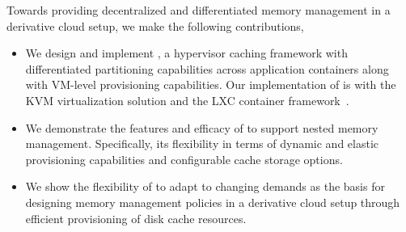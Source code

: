%
%
Towards providing decentralized and differentiated memory management 
in a derivative cloud setup, we make the following contributions,
\begin{itemize}
\item We design and implement \dd, a hypervisor caching framework
with differentiated partitioning capabilities across application
containers along with VM-level provisioning capabilities.
Our implementation of \dd{} is with the KVM virtualization 
solution and the LXC container framework~\cite{lxc}.
\item We demonstrate the features and efficacy of \dd{} to
support nested memory management.
Specifically, its flexibility in terms of dynamic and elastic
provisioning capabilities and configurable cache storage options.
%
\item We show the flexibility of \dd{} to adapt to changing demands
as the basis for designing memory management
policies in a derivative cloud setup through efficient provisioning of disk cache
resources.
%
\end{itemize}  
%
%
